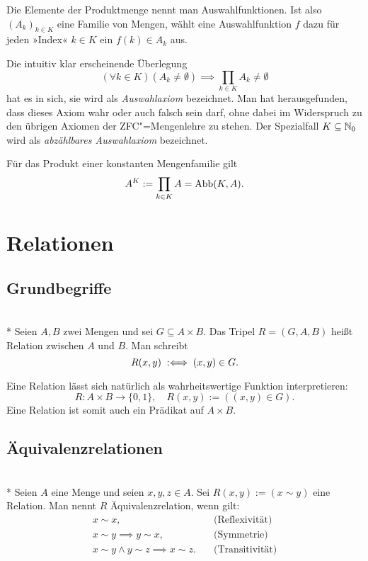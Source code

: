 Die Elemente der Produktmenge nennt man Auswahlfunktionen.
Ist also $(A_k)_{k\in K}$ eine Familie von Mengen, wählt eine
Auswahlfunktion $f$ dazu für jeden »Index« $k\in K$ ein $f(k)\in A_k$
aus.

Die intuitiv klar erscheinende Überlegung
\begin{equation}
(\forall k\in K)(A_k\ne\emptyset) \implies \prod_{k\in K} A_k\ne\emptyset
\end{equation}
hat es in sich, sie wird als \emph{Auswahlaxiom} bezeichnet.
Man hat herausgefunden, dass dieses Axiom wahr oder auch falsch sein
darf, ohne dabei im Widerspruch zu den übrigen Axiomen der
ZFC"=Mengenlehre zu stehen. Der Spezialfall $K\subseteq\mathbb N_0$ wird
als \emph{abzählbares Auswahlaxiom} bezeichnet.

Für das Produkt einer konstanten Mengenfamilie gilt
\begin{equation}
A^K := \prod_{k\in K} A = \operatorname{Abb}(K,A).
\end{equation}

\newpage
\section{Relationen}
\subsection{Grundbegriffe}

\begin{Definition}[Relation]\mbox{}\\*
Seien $A,B$ zwei Mengen und sei $G\subseteq A\times B$.
Das Tripel $R=(G,A,B)$ heißt Relation zwischen $A$ und $B$.
Man schreibt
\[R(x,y) \;:\Longleftrightarrow\; (x,y)\in G.\]
\end{Definition}
Eine Relation lässt sich natürlich als wahrheitswertige Funktion
interpretieren:
\[R\colon A\times B\to\{0,1\},\quad R(x,y):=((x,y)\in G).\]
Eine Relation ist somit auch ein Prädikat auf $A\times B$.

\subsection{Äquivalenzrelationen}
\begin{Definition}[Äquivalenzrelation]%
\mbox{}\\*
Seien $A$ eine Menge und seien $x,y,z\in A$. Sei $R(x,y):=(x\sim y)$ eine
Relation. Man nennt $R$ Äquivalenzrelation, wenn gilt:
\[\begin{array}{ll}
x\sim x, &\text{(Reflexivität)}\\
x\sim y \implies y\sim x, & \text{(Symmetrie)}\\
x\sim y\land y\sim z\implies x\sim z.\quad & \text{(Transitivität)}
\end{array}\]
\end{Definition}

